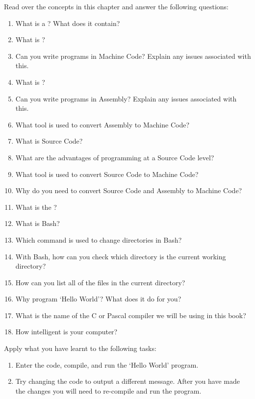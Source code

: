 Read over the concepts in this chapter and answer the following questions:
\begin{enumerate}
  \item What is a ? What does it contain?
  \item What is ?
  \item Can you write programs in Machine Code? Explain any issues associated with this.
  \item What is ?
  \item Can you write programs in Assembly? Explain any issues associated with this.
  \item What tool is used to convert Assembly to Machine Code?
  \item What is Source Code?
  \item What are the advantages of programming at a Source Code level?
  \item What tool is used to convert Source Code to Machine Code?
  \item Why do you need to convert Source Code and Assembly to Machine Code?
  \item What is the ? 
  \item What is Bash?
  \item Which command is used to change directories in Bash?
  \item With Bash, how can you check which directory is the current working directory?
  \item How can you list all of the files in the current directory?
  \item Why program `Hello World'? What does it do for you?
  \item What is the name of the C or Pascal compiler we will be using in this book?
  \item How intelligent is your computer?
\end{enumerate}

\bigskip
Apply what you have learnt to the following tasks:

\begin{enumerate}
  \item Enter the code, compile, and run the `Hello World' program.
  \item Try changing the code to output a different message. After you have made the changes you will need to re-compile and run the program.
\end{enumerate}

